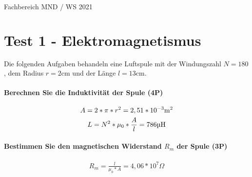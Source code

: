 \documentclass{article}
\begin{document}
Fachbereich MND / WS 2021

\part*{Test 1 - Elektromagnetismus}

Die folgenden Aufgaben behandeln eine Luftspule mit der Windungszahl $N = 180$, dem Radius $r = 2\text{cm}$ und der Länge $l = 13\text{cm}$.

\subsection*{Berechnen Sie die Induktivität der Spule (4P)}

\begin{gather}
A = 2*\pi*r^{2} = 2,51*10^{-3}\text{m}^{2} \\
L = N^2*\mu_{0}*\frac{A}{l} = 786\text{\textmu H}
\end{gather}

\subsection*{Bestimmen Sie den magnetischen Widerstand $R_{m}$ der Spule (3P)}

\begin{gather}
R_{m} = \frac{l}{\mu_{0} * A} = 4,06*10^{7}\Omega
\end{gather}
\end{document}

